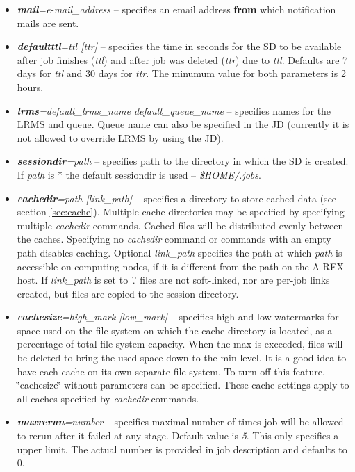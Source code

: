 \documentclass{article}                            %
\begin{document}
\begin{itemize}
\item \textbf{\textit{mail}}\textit{=e-mail\_address} -- specifies an email
address \textbf{from} which notification mails are sent.
\item \textbf{\textit{defaultttl}}\textit{=ttl {[}ttr]} -- specifies the
time in seconds for the SD to be available after job finishes (\emph{ttl})
and after job was deleted (\emph{ttr}) due to \emph{ttl}. Defaults
are 7 days for \emph{ttl} and 30 days for \emph{ttr}. The minumum value
for both parameters is 2 hours.
\item \textbf{\textit{lrms}}\textit{=default\_lrms\_name default\_queue\_name}
-- specifies names for the LRMS and queue. Queue name can also be specified
in the JD (currently it is not allowed to override LRMS by using
the JD).
\item \textbf{\textit{sessiondir}}\textit{=path} -- specifies path to
  the directory in which the SD is created. If \emph{path} is {*} the
  default sessiondir is used -- \textit{\$HOME/.jobs}.
\item \textbf{\textit{cachedir}}\textit{=path {[}link\_path]} -- specifies
a directory to store cached data (see section \ref{sec:cache}). Multiple
cache directories may be specified by specifying multiple \emph{cachedir}
commands. Cached files will be distributed evenly between the caches.
Specifying no \emph{cachedir }command or commands with an empty path
disables caching. Optional \textit{link\_path} specifies the path
at which \emph{path} is accessible on computing nodes, if it is different
from the path on the A-REX host. If \textit{link\_path} is set to '.'
files are not soft-linked, nor are per-job links created, but files
are copied to the session directory.
\item \textbf{\textit{cachesize}}\textit{=high\_mark {[}low\_mark]} --
  specifies high and low watermarks for space used on the file system
  on which the cache directory is located, as a percentage of total
  file system capacity. When the max is exceeded, files will be
  deleted to bring the used space down to the min level. It is a good
  idea to have each cache on its own separate file system. To turn off
  this feature, \char`\"{}cachesize\char`\"{} without parameters can
  be specified. These cache settings apply to all caches specified by
  \emph{cachedir} commands.
\item \textbf{\textit{maxrerun}}\textit{=number} -- specifies maximal number
of times job will be allowed to rerun after it failed at any stage.
Default value is \emph{5}. This only specifies a upper limit. The actual
number is provided in job description and defaults to 0.
\end{itemize}
\end{document}
